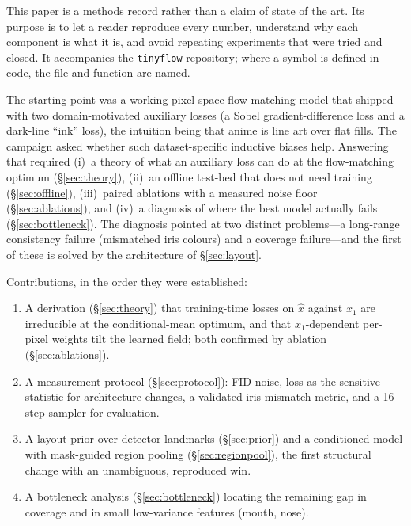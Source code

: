\documentclass[11pt]{article}
\newcommand{\xh}{\hat{x}}
\begin{document}
This paper is a methods record rather than a claim of state of the art. Its purpose is
to let a reader reproduce every number, understand why each component is what it is,
and avoid repeating experiments that were tried and closed. It accompanies the
\texttt{tinyflow} repository; where a symbol is defined in code, the file and function
are named.

The starting point was a working pixel-space flow-matching model that shipped with two
domain-motivated auxiliary losses (a Sobel gradient-difference loss and a dark-line
``ink'' loss), the intuition being that anime is line art over flat fills. The campaign
asked whether such dataset-specific inductive biases help. Answering that required
(i)~a theory of what an auxiliary loss can do at the flow-matching optimum
(\S\ref{sec:theory}), (ii)~an offline test-bed that does not need training
(\S\ref{sec:offline}), (iii)~paired ablations with a measured noise floor
(\S\ref{sec:ablations}), and (iv)~a diagnosis of where the best model actually fails
(\S\ref{sec:bottleneck}). The diagnosis pointed at two distinct problems---a
long-range consistency failure (mismatched iris colours) and a coverage failure---and the
first of these is solved by the architecture of \S\ref{sec:layout}.

Contributions, in the order they were established:
\begin{enumerate}[leftmargin=1.5em,itemsep=1pt]
\item A derivation (\S\ref{sec:theory}) that training-time losses on $\xh$ against $x_1$
      are irreducible at the conditional-mean optimum, and that $x_1$-dependent per-pixel
      weights tilt the learned field; both confirmed by ablation (\S\ref{sec:ablations}).
\item A measurement protocol (\S\ref{sec:protocol}): FID noise, loss as the sensitive
      statistic for architecture changes, a validated iris-mismatch metric, and a
      16-step sampler for evaluation.
\item A layout prior over detector landmarks (\S\ref{sec:prior}) and a conditioned model
      with mask-guided region pooling (\S\ref{sec:regionpool}), the first structural
      change with an unambiguous, reproduced win.
\item A bottleneck analysis (\S\ref{sec:bottleneck}) locating the remaining gap in
      coverage and in small low-variance features (mouth, nose).
\end{enumerate}

\end{document}

